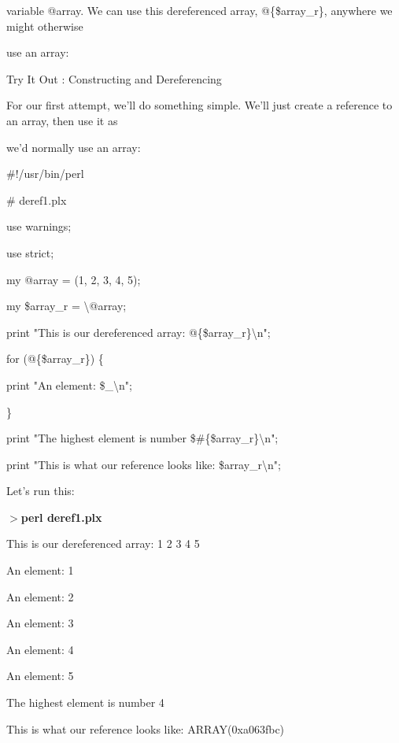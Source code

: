 \documentclass[a4paper,11pt]{book}
\begin{document}
\noindent variable @array.  We  can use  this  dereferenced  array,  @\{\$array\_r\},  anywhere  we  might  otherwise

\noindent use an array:

\noindent 

\noindent Try It Out : Constructing and Dereferencing

\noindent 

\noindent For our first attempt, we'll do something simple. We'll just create a reference to an array, then use it as

\noindent we'd normally use an array:

\noindent 

\noindent \#!/usr/bin/perl

\noindent \# deref1.plx

\noindent use warnings;

\noindent use strict;

\noindent 

\noindent my @array = (1, 2, 3, 4, 5);

\noindent my \$array\_r = \textbackslash @array;

\noindent 

\noindent print "This is our dereferenced array: @\{\$array\_r\}\textbackslash n";

\noindent for (@\{\$array\_r\}) \{

\noindent print "An element: \$\_\textbackslash n";

\noindent \}

\noindent print "The highest element is number \$\#\{\$array\_r\}\textbackslash n";

\noindent print "This is what our reference looks like: \$array\_r\textbackslash n";

\noindent 

\noindent Let's run this:

\noindent 

\noindent $>$\textbf{perl deref1.plx}

\noindent This is our dereferenced array: 1 2 3 4 5

\noindent An element: 1

\noindent An element: 2

\noindent An element: 3

\noindent An element: 4

\noindent An element: 5

\noindent The highest element is number 4

\noindent This is what our reference looks like: ARRAY(0xa063fbc)
\end{document}
